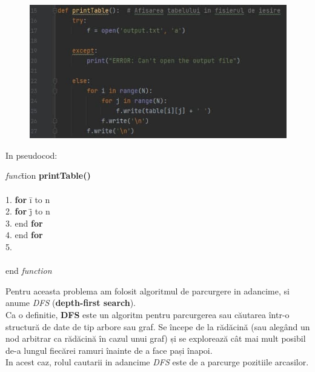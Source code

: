 \documentclass{article}
\begin{document}
\begin{figure}[htbp!]
\centering
\includegraphics[scale=0.5]{table}
\end{figure}

In pseudocod: \\
\begin{tabbing} 
\indent\textit{func}\={tion}
\textbf{printTable()} \\\\
1. \indent\>\textbf{for} \= i to n \\
2. \indent\>\>\textbf{for} \= j to n \\
3. \indent\>\>end \textbf{for}\\
4. \indent\>end \textbf{for}\\
5. \indent{} \\\\
\indent end \textit{function}\\
\end{tabbing}


Pentru aceasta problema am folosit algoritmul de parcurgere in adancime, si anume \textit{DFS} (\textbf{depth-first search}).  \\

\hspace{0.1cm} Ca o definitie, \textbf{DFS} este un algoritm pentru parcurgerea sau căutarea într-o structură de date de tip arbore sau graf. Se începe de la rădăcină (sau alegând un nod arbitrar ca rădăcină în cazul unui graf) și se explorează cât mai mult posibil de-a lungul fiecărei ramuri înainte de a face pași înapoi. \\

\hspace{0.1cm}In acest caz, rolul cautarii in adancime \textit{DFS} este de a parcurge pozitiile arcasilor. \\\\
\\
\end{document}
